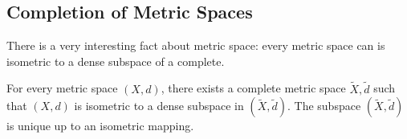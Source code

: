 \subsection{Completion of Metric Spaces}
There is a very interesting fact about metric space: every metric space can 
is isometric to a dense subspace of a complete. 
\begin{thm}
For every metric space $(X, d)$, there exists a complete metric space 
$\tilde{X}, \tilde{d}$ such that $(X, d)$ is isometric to a dense subspace in 
$(\tilde{X}, \tilde{d})$. 
The subspace $(\tilde{X}, \tilde{d})$ is unique up to an isometric mapping. 
\end{thm}
